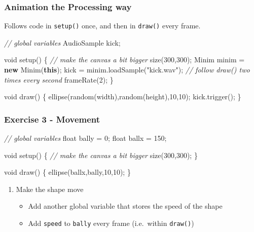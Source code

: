 \documentclass[ignorenonframetext,]{beamer}
\newenvironment{Shaded}{}{}
\newcommand{\KeywordTok}[1]{\textcolor[rgb]{0.00,0.44,0.13}{\textbf{{#1}}}}
\newcommand{\DataTypeTok}[1]{\textcolor[rgb]{0.56,0.13,0.00}{{#1}}}
\newcommand{\DecValTok}[1]{\textcolor[rgb]{0.25,0.63,0.44}{{#1}}}
\newcommand{\StringTok}[1]{\textcolor[rgb]{0.25,0.44,0.63}{{#1}}}
\newcommand{\CommentTok}[1]{\textcolor[rgb]{0.38,0.63,0.69}{\textit{{#1}}}}
\newcommand{\FunctionTok}[1]{\textcolor[rgb]{0.02,0.16,0.49}{{#1}}}
\newcommand{\NormalTok}[1]{{#1}}
\begin{document}
\begin{frame}[fragile]\frametitle{Animation the Processing way}

Follows code in \texttt{setup()} once, and then in \texttt{draw()} every
frame.

\begin{Shaded}
\begin{Highlighting}[]
\CommentTok{// global variables}
\NormalTok{AudioSample kick;}

\DataTypeTok{void} \FunctionTok{setup}\NormalTok{() \{}
  \CommentTok{// make the canvas a bit bigger}
  \FunctionTok{size}\NormalTok{(}\DecValTok{300}\NormalTok{,}\DecValTok{300}\NormalTok{);}
  \NormalTok{Minim minim = }\KeywordTok{new} \FunctionTok{Minim}\NormalTok{(}\KeywordTok{this}\NormalTok{);}
  \NormalTok{kick = minim.}\FunctionTok{loadSample}\NormalTok{(}\StringTok{"kick.wav"}\NormalTok{);}
  \CommentTok{// follow draw() two times every second}
  \FunctionTok{frameRate}\NormalTok{(}\DecValTok{2}\NormalTok{);}
\NormalTok{\}}

\DataTypeTok{void} \FunctionTok{draw}\NormalTok{() \{}
  \FunctionTok{ellipse}\NormalTok{(}\FunctionTok{random}\NormalTok{(width),}\FunctionTok{random}\NormalTok{(height),}\DecValTok{10}\NormalTok{,}\DecValTok{10}\NormalTok{);}
  \NormalTok{kick.}\FunctionTok{trigger}\NormalTok{();}
\NormalTok{\}}
\end{Highlighting}
\end{Shaded}

\end{frame}

\begin{frame}[fragile]\frametitle{Exercise 3 - Movement}

\begin{Shaded}
\begin{Highlighting}[]
\CommentTok{// global variables}
\DataTypeTok{float} \NormalTok{bally = }\DecValTok{0}\NormalTok{;}
\DataTypeTok{float} \NormalTok{ballx = }\DecValTok{150}\NormalTok{;}

\DataTypeTok{void} \FunctionTok{setup}\NormalTok{() \{}
  \CommentTok{// make the canvas a bit bigger}
  \FunctionTok{size}\NormalTok{(}\DecValTok{300}\NormalTok{,}\DecValTok{300}\NormalTok{);}
\NormalTok{\}}

\DataTypeTok{void} \FunctionTok{draw}\NormalTok{() \{}
  \FunctionTok{ellipse}\NormalTok{(ballx,bally,}\DecValTok{10}\NormalTok{,}\DecValTok{10}\NormalTok{);}
\NormalTok{\}}
\end{Highlighting}
\end{Shaded}

\begin{enumerate}[1.]
\item
  Make the shape move

  \begin{itemize}
  \item
    Add another global variable that stores the speed of the shape
  \item
    Add \texttt{speed} to \texttt{bally} every frame (i.e.~within
    \texttt{draw()})
  \end{itemize}
\end{enumerate}

\end{frame}
\end{document}
